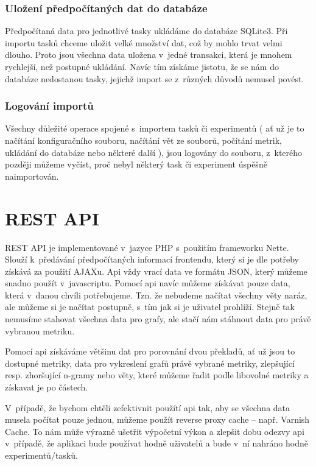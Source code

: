 \subsubsection{Uložení předpočítaných dat do databáze}
Předpočítaná data pro jednotlivé tasky ukládáme do databáze SQLite3.
Při importu tasků chceme uložit velké množství dat,
  což by mohlo trvat velmi dlouho.
Proto jsou všechna data uložena v~jedné transakci,
  která je mnohem rychlejší,
  než postupné ukládání.
Navíc tím získáme jistotu,
  že se nám do databáze nedostanou tasky,
  jejichž import se z~různých důvodů nemusel povést.
 
\subsubsection{Logování importů}
Všechny důležité operace spojené s~importem tasků či experimentů
  ( ať už je to načítání konfiguračního souboru, načítání vět ze souborů,
  počítání metrik, ukládání do databáze nebo některé další ), 
  jsou logovány do souboru,
  z~kterého později můžeme vyčíst,
  proč nebyl některý task či experiment úspěšně naimportován. 


\section{REST API}
REST API je implementované v~jazyce PHP s~použitím frameworku Nette.
Slouží k~předávání předpočítaných informací frontendu,
  který si je dle potřeby získává za použití AJAXu.
Api vždy vrací data ve formátu JSON,
  který můžeme snadno použít v~javascriptu.
Pomocí api navíc můžeme získávat pouze data,
  která v~danou chvíli potřebujeme.
Tzn. že nebudeme načítat všechny věty naráz,
  ale můžeme si je načítat postupně,
  s~tím jak si je uživatel prohlíží.
Stejně tak nemusíme stahovat všechna data pro grafy,
  ale stačí nám stáhnout data pro právě vybranou metriku.

Pomocí api získáváme většinu dat pro porovnání dvou překladů,
  ať už jsou to dostupné metriky,
  data pro vykreslení grafů právě vybrané metriky,
  zlepšující resp. zhoršující n-gramy
  nebo věty,
  které můžeme řadit podle libovolné metriky a získavat je po částech.

V~případě, že bychom chtěli zefektivnit použítí api tak,
  aby se všechna data musela počítat pouze jednou,
  můžeme použít reverse proxy cache -- např. Varnish Cache.
To nám může výrazně ušetřit výpočetní výkon a zlepšit dobu odezvy api v~případě,
  že aplikaci bude používat hodně uživatelů
  a bude v~ní nahráno hodně experimentů/tasků.

